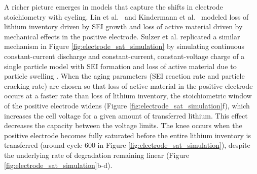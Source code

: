 \documentclass[journal=jpclcd,manuscript=article]{achemso}
\begin{document}

A richer picture emerges in models that capture the shifts in electrode stoichiometry with cycling. Lin et al.~\cite{lin_comprehensive_2013} and Kindermann et al.~\cite{kindermann_sei_2017} modeled loss of lithium inventory driven by SEI growth and loss of active material driven by mechanical effects in the positive electrode. Sulzer et al.\cite{sulzer_accelerated_2021} replicated a similar mechanism in Figure \ref{fig:electrode_sat_simulation} by simulating continuous constant-current discharge and constant-current, constant-voltage charge of a single particle model with SEI formation \cite{yang_modeling_2017} and loss of active material \cite{reniers_review_2019, laresgoiti_modeling_2015} due to particle swelling \cite{ai_electrochemical_2020, mohtat_differential_2020}.
When the aging parameters (SEI reaction rate and particle cracking rate) are chosen so that loss of active material in the positive electrode occurs at a faster rate than loss of lithium inventory, the stoichiometric window of the positive electrode widens (Figure \ref{fig:electrode_sat_simulation}f), which increases the cell voltage for a given amount of transferred lithium. This effect decreases the capacity between the voltage limits. The knee occurs when the positive electrode becomes fully saturated before the entire lithium inventory is transferred (around cycle 600 in Figure \ref{fig:electrode_sat_simulation}), despite the underlying rate of degradation remaining linear (Figure \ref{fig:electrode_sat_simulation}b-d).
\end{document}
